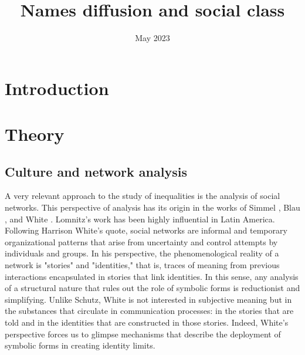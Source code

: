 



\title{Names diffusion and social class}
\author{}
\date{May 2023}



\maketitle

\section{Introduction}


\bigskip

\section{Theory}

\subsection{Culture and network analysis}

A very relevant approach to the study of inequalities is the analysis of social networks. This perspective of analysis has its origin in the works of Simmel 
 \parencite*{simmel_sociology_1964}, Blau \parencite*{blau_exchange_1986}, and White \parencite*{white_chains_1969,white_identity_2008}. Lomnitz's \parencite*{lomnitz_como_1975} work has been highly influential in Latin America. Following Harrison White's \parencite*{white_identity_2008} quote, social networks are informal and temporary organizational patterns that arise from uncertainty and control attempts by individuals and groups. In his perspective, the phenomenological reality of a network is "stories" and "identities," that is, traces of meaning from previous interactions encapsulated in stories that link identities. In this sense, any analysis of a structural nature that rules out the role of symbolic forms is reductionist and simplifying. Unlike Schutz, White is not interested in subjective meaning but in the substances that circulate in communication processes: in the stories that are told and in the identities that are constructed in those stories. Indeed, White's perspective forces us to glimpse mechanisms that describe the deployment of symbolic forms in creating identity limits. 
\bigskip

